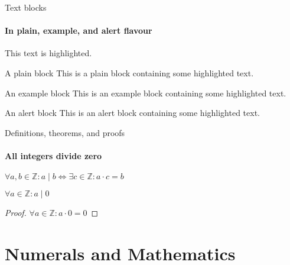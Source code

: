 \documentclass{ELSAbeamer}
\begin{document}
\begin{frame}{Text blocks}
\framesubtitle{In plain, example, and \alert{alert} flavour}
\alert{This text} is highlighted.

\begin{block}{A plain block}
    This is a plain block containing some \alert{highlighted text}.
\end{block}

\begin{exampleblock}{An example block}
    This is an example block containing some \alert{highlighted text}.
\end{exampleblock}

\begin{alertblock}{An alert block}
    This is an alert block containing some \alert{highlighted text}.
\end{alertblock}
\end{frame}

\begin{frame}{Definitions, theorems, and proofs}
\framesubtitle{All integers divide zero}
\begin{definition}
    $\forall a,b\in\mathbb{Z}: a\mid b\iff\exists c\in\mathbb{Z}:a\cdot c=b$
\end{definition}

\begin{theorem}
    $\forall a\in\mathbb{Z}: a\mid 0$
\end{theorem}

\begin{proof}
    $\forall a\in\mathbb{Z}: a\cdot 0=0$
\end{proof}
\end{frame}

\section{Numerals and Mathematics}
\end{document}
